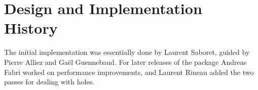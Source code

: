 

\section{Design and Implementation History}

The initial implementation was essentially done by Laurent Saboret, guided by Pierre Alliez and Ga\"el Guennebaud. 
For later releases of the package Andreas Fabri worked on performance improvements, and Laurent Rineau added the
two passes for dealing with holes.
